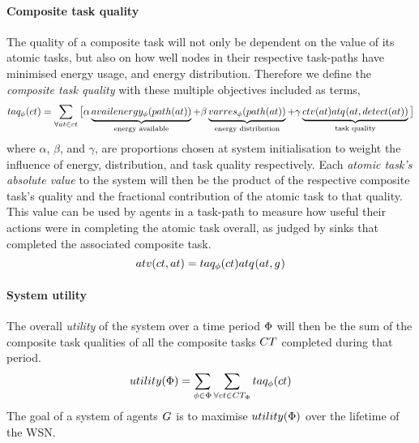 \paragraph{Composite task quality}
\label{section:composite_task_quality}
The quality of a composite task will not only be dependent on the value of its atomic tasks, but also on how well nodes in their respective task-paths have minimised energy usage, and energy distribution. Therefore we define the \textit{composite task quality} with these multiple objectives included as terms,
\begin{equation}
	\label{eq:ctv}
	\functionCompositeTaskQuality{}{} = 
	\sum\limits_{\forall \varAtomicTask{}{} \in \varCompositeTask{}{}}
	\big\lbrack
	\alpha\underbrace{\functionEnergyAvailable{\functionTaskArc{}{}}{}}_{\text{energy available}}
	+ \beta\underbrace{\functionEnergyVariability{\functionTaskArc{}{}}{}}_{\text{energy distribution}}
	+ 
	\gamma\underbrace{
		\functionComponentTaskValue{}{}
		\functionAtomicTaskQualitySignature{\varAtomicTask{}{}}{\functionDetectorRole{}{}}
	}_{\text{task quality}}
\big\rbrack
\end{equation}
where $\alpha$, $\beta$, and $\gamma$, are proportions chosen at system initialisation to weight the influence of energy, distribution, and task quality respectively. Each \textit{atomic task's absolute value} to the system will then be the product of the respective composite task's quality and the fractional contribution of the atomic task to that quality. This value can be used by agents in a task-path to measure how useful their actions were in completing the atomic task overall, as judged by sinks that completed the associated composite task.
\begin{equation}
	\functionTaskAbsoluteValue{}{} = 
	\functionCompositeTaskQuality{}{}
	\functionAtomicTaskQualitySignature{}{}
\end{equation}

\paragraph{System utility}
\label{section:utility}
The overall \textit{ utility} of the system over a time period $\Phi$ will then be the sum of the composite task qualities of all the composite tasks $\setCompositeTask{}{}$ completed during that period.
	\begin{equation}
		\label{eq:system_utility}
		\functionSystemUtility{}{} = \sum\limits_{\varTime{}{} \in \setTime{}{}}
		\sum\limits_{\forall \varCompositeTask{}{} \in \setCompositeTask{\setTime{}{}}{}}
		\functionCompositeTaskQuality{}{}
	\end{equation}
The goal of a system of agents $G_{}^{}$ is to maximise $\functionSystemUtility{}{}$ over the lifetime of the WSN.

